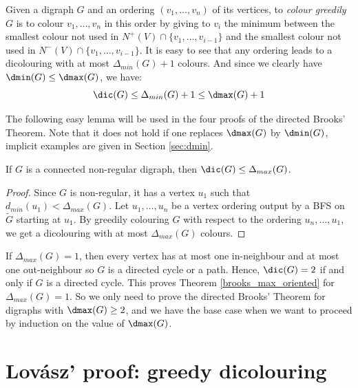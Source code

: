 Given a digraph $G$ and an ordering $(v_1, \dots, v_n)$ of its vertices, 
to \textit{colour greedily}  $G$ is to colour $v_1, \dots, v_n$ in this order by giving to $v_i$ the minimum between the smallest colour not used in $N^+(V) \cap \{v_1, \dots, v_{i-1}\}$ and the smallest colour not used in $N^-(V) \cap \{v_1, \dots, v_{i-1}\}$. 
It is easy to see that any ordering leads to a dicolouring with at most $\Delta_{min}(G)+1$ colours. And since we clearly have $\dmin(G) \leq \dmax(G)$, we have:
$$\dic(G) \leq \Delta_{min}(G) +1 \leq \dmax(G) +1$$


The following easy lemma will be used in the four proofs of the directed Brooks' Theorem. Note that it does not hold if one replaces $\dmax(G)$ by $\dmin(G)$, implicit examples are given in Section \ref{sec:dmin}. 

\begin{lemma}\label{lem:reg}
If $G$ is a connected non-regular digraph, then  $\dic(G) \leq \Delta_{max}(G)$.
\end{lemma}

\begin{proof}
Since $G$ is non-regular, it has a vertex $u_1$ such that $d_{min}(u_1) < \Delta_{max}(G)$. Let $u_1, \dots, u_n$ be a vertex ordering output by a BFS on $\tilde G$ starting at $u_1$. By greedily colouring $G$ with respect to the ordering $u_n, \dots, u_1$, we get a dicolouring with at most  $\Delta_{max}(G)$ colours.
\end{proof}

If $\Delta_{max}(G) = 1$, then every vertex has at most one in-neighbour and at most one out-neighbour so $G$ is a directed cycle or a path. Hence, $\dic(G) = 2$ if and only if $G$ is a directed cycle. This proves Theorem \ref{brooks_max_oriented} for $\Delta_{max}(G) = 1$. So we only need to prove the directed Brooks' Theorem for digraphs with $\dmax(G) \geq 2$,  and we have the base case when we want to proceed by induction on the value of $\dmax(G)$. 




\section{Lov\'asz' proof: greedy dicolouring}\label{sec:lovasz}

